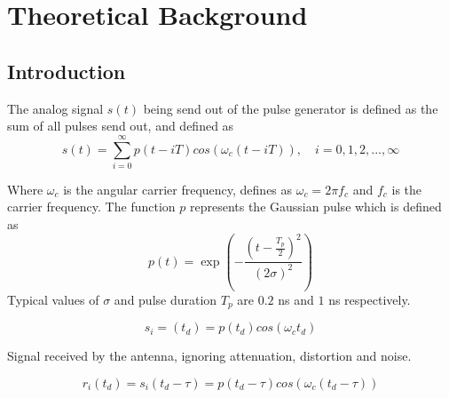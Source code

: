 \chapter{Theoretical Background}

\section{Introduction}
The analog signal $s(t)$ being send out of the pulse generator is defined as the sum of all pulses send out, and defined as
\begin{equation}\label{eq:analog_pulse_signal}
s(t) = \sum_{i=0}^{\infty} p(t-iT)cos(\omega_c(t-iT)),\quad i = 0,1,2,...,\infty
\end{equation}







Where $\omega_c$ is the angular carrier frequency, defines as $\omega_c= 2 \pi f_c$ and $f_c$ is the carrier frequency. The function $p$ represents the Gaussian pulse which is defined as
\begin{equation}
    p(t) = \exp\left( -\frac{(t-\frac{T_p}{2})^2}{(2\sigma)^2} \right)
\end{equation}
Typical values of $\sigma$ and pulse duration $T_p$ are $0.2$ ns and $1$ ns respectively.

\begin{equation}
    s_i = (t_d) = p(t_d)cos(\omega_c t_d)
\end{equation}

Signal received by the antenna, ignoring attenuation, distortion and noise.

\begin{equation}\label{eq:receiver_signal}
    r_i(t_d) = s_i(t_d-\tau) = p(t_d-\tau)cos(\omega_c(t_d-\tau)) 
\end{equation}

